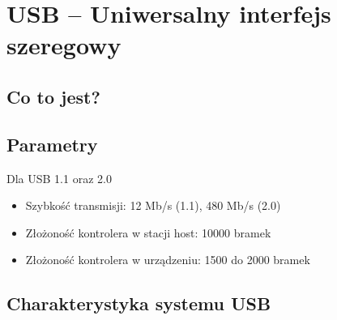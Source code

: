 \section{USB – Uniwersalny interfejs szeregowy}
	\subsection{Co to jest?}
	\subsection{Parametry}
	Dla USB 1.1 oraz 2.0
	\begin{itemize}
		\item Szybkość transmisji: 12 Mb/s (1.1), 480 Mb/s (2.0)
		\item Złożoność kontrolera w stacji host: 10000 bramek
		\item Złożoność kontrolera w urządzeniu: 1500 do 2000 bramek
	\end{itemize}
	\subsection{Charakterystyka systemu USB}
